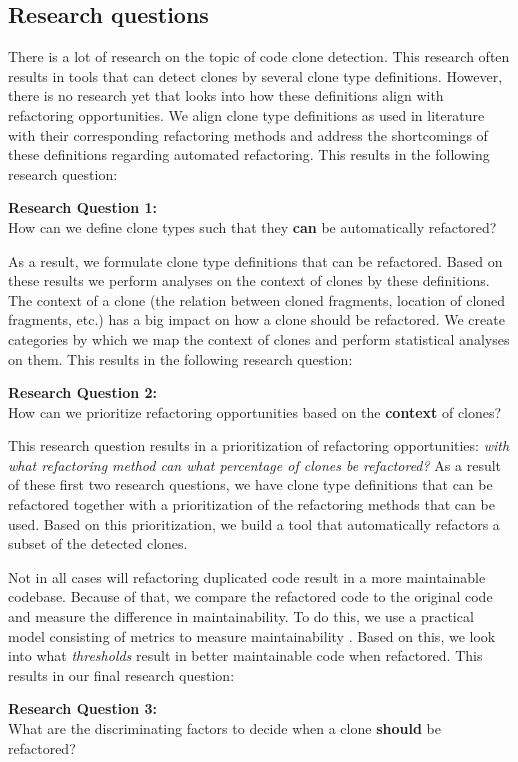 \subsection{Research questions}
There is a lot of research on the topic of code clone detection. This research often results in tools that can detect clones by several clone type definitions. However, there is no research yet that looks into how these definitions align with refactoring opportunities. We align clone type definitions as used in literature \cite{roy2007survey} with their corresponding refactoring methods \cite{fowler2018refactoring} and address the shortcomings of these definitions regarding automated refactoring. This results in the following research question:
\begin{displayquote}
\textbf{Research Question 1:}\\How can we define clone types such that they \textbf{can} be automatically refactored?
\end{displayquote}
As a result, we formulate clone type definitions that can be refactored. Based on these results we perform analyses on the context of clones by these definitions. The context of a clone (the relation between cloned fragments, location of cloned fragments, etc.) has a big impact on how a clone should be refactored. We create categories by which we map the context of clones and perform statistical analyses on them. This results in the following research question:
\begin{displayquote}
\textbf{Research Question 2:}\\How can we prioritize refactoring opportunities based on the \textbf{context} of clones?
\end{displayquote}
This research question results in a prioritization of refactoring opportunities: \textit{with what refactoring method can what percentage of clones be refactored?} As a result of these first two research questions, we have clone type definitions that can be refactored together with a prioritization of the refactoring methods that can be used. Based on this prioritization, we build a tool that automatically refactors a subset of the detected clones.

Not in all cases will refactoring duplicated code result in a more maintainable codebase. Because of that, we compare the refactored code to the original code and measure the difference in maintainability. To do this, we use a practical model consisting of metrics to measure maintainability \cite{heitlager2007practical}. Based on this, we look into what \textit{thresholds} result in better maintainable code when refactored. This results in our final research question:
\begin{displayquote}
\textbf{Research Question 3:}\\What are the discriminating factors to decide when a clone \textbf{should} be refactored?
\end{displayquote}


